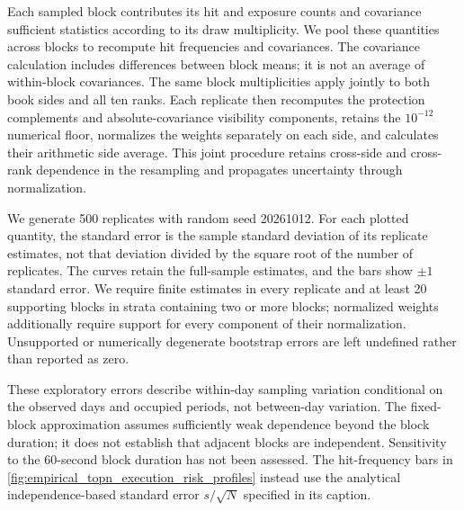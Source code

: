 Each sampled block contributes its hit and exposure counts and covariance sufficient statistics according to its draw multiplicity. We pool these quantities across blocks to recompute hit frequencies and covariances. The covariance calculation includes differences between block means; it is not an average of within-block covariances. The same block multiplicities apply jointly to both book sides and all ten ranks. Each replicate then recomputes the protection complements and absolute-covariance visibility components, retains the $10^{-12}$ numerical floor, normalizes the weights separately on each side, and calculates their arithmetic side average. This joint procedure retains cross-side and cross-rank dependence in the resampling and propagates uncertainty through normalization.

We generate 500 replicates with random seed 20261012. For each plotted quantity, the standard error is the sample standard deviation of its replicate estimates, not that deviation divided by the square root of the number of replicates. The curves retain the full-sample estimates, and the bars show $\pm1$ standard error. We require finite estimates in every replicate and at least 20 supporting blocks in strata containing two or more blocks; normalized weights additionally require support for every component of their normalization. Unsupported or numerically degenerate bootstrap errors are left undefined rather than reported as zero.

These exploratory errors describe within-day sampling variation conditional on the observed days and occupied periods, not between-day variation. The fixed-block approximation assumes sufficiently weak dependence beyond the block duration; it does not establish that adjacent blocks are independent. Sensitivity to the 60-second block duration has not been assessed. The hit-frequency bars in \cref{fig:empirical_topn_execution_risk_profiles} instead use the analytical independence-based standard error $s/\sqrt{N}$ specified in its caption.




